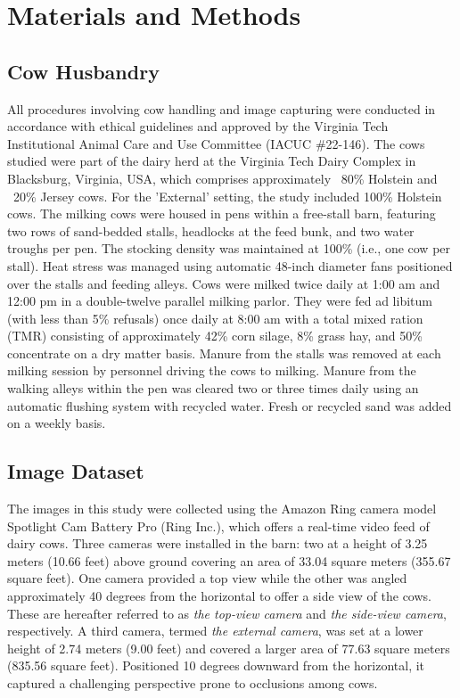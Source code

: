 \section{Materials and Methods}

\subsection*{Cow Husbandry}

All procedures involving cow handling and image capturing were conducted in accordance with ethical guidelines and approved by the Virginia Tech Institutional Animal Care and Use Committee (IACUC \#22-146). The cows studied were part of the dairy herd at the Virginia Tech Dairy Complex in Blacksburg, Virginia, USA, which comprises approximately ~80\% Holstein and ~20\% Jersey cows. For the 'External' setting, the study included  100\% Holstein cows. The milking cows were housed in pens within a free-stall barn, featuring two rows of sand-bedded stalls, headlocks at the feed bunk, and two water troughs per pen. The stocking density was maintained at 100\% (i.e., one cow per stall). Heat stress was managed using automatic 48-inch diameter fans positioned over the stalls and feeding alleys. Cows were milked twice daily at 1:00 am and 12:00 pm in a double-twelve parallel milking parlor. They were fed ad libitum (with less than 5\% refusals) once daily at 8:00 am with a total mixed ration (TMR) consisting of approximately 42\% corn silage, 8\% grass hay, and 50\% concentrate on a dry matter basis. Manure from the stalls was removed at each milking session by personnel driving the cows to milking. Manure from the walking alleys within the pen was cleared two or three times daily using an automatic flushing system with recycled water. Fresh or recycled sand was added on a weekly basis.

\subsection*{Image Dataset}

The images in this study were collected using the Amazon Ring camera model Spotlight Cam Battery Pro (Ring Inc.), which offers a real-time video feed of dairy cows. Three cameras were installed in the barn: two at a height of 3.25 meters (10.66 feet) above ground covering an area of 33.04 square meters (355.67 square feet). One camera provided a top view while the other was angled approximately 40 degrees from the horizontal to offer a side view of the cows. These are hereafter referred to as \textit{the top-view camera} and \textit{the side-view camera}, respectively. A third camera, termed \textit{the external camera}, was set at a lower height of 2.74 meters (9.00 feet) and covered a larger area of 77.63 square meters (835.56 square feet). Positioned 10 degrees downward from the horizontal, it captured a challenging perspective prone to occlusions among cows.

